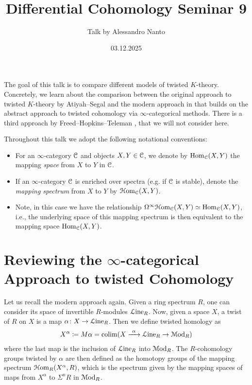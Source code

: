 \documentclass[10pt]{amsart}
\title{Differential Cohomology Seminar 9}
\date{03.12.2025}
\author{Talk by Alessandro Nanto}
\begin{document}
\maketitle

The goal of this talk is to compare different models of twisted $K$-theory. Concretely, we learn about the comparison between the original approach to twisted $K$-theory by Atiyah--Segal \cite{atiyahsegal2004twistedktheory} and the modern approach in \cite{abghr2014infty} that builds on the abstract approach to twisted cohomology via $\infty$-categorical methods. There is a third approach by Freed--Hopkins--Teleman \cite{freedhopkinsteleman2011loopgroupsi}, that we will not consider here.

\begin{remark}
	Throughout this talk we adopt the following notational conventions:
	\begin{itemize}
		\item For an $\infty$-category $\mathcal{C}$ and objects $X,Y \in \mathcal{C}$, we denote by $\mathrm{Hom}_{\mathcal{C}}(X,Y)$ the mapping \emph{space} from $X$ to $Y$ in $\mathcal{C}$. 
		\item If an $\infty$-category $\mathcal{C}$ is enriched over spectra (e.g. if $\mathcal{C}$ is stable), denote the \emph{mapping	spectrum} from $X$ to $Y$ by $\mathcal{H}\mathrm{om}_{\mathcal{C}}(X,Y)$. 
  \item Note, in this case we have the relationship $\Omega^{\infty} \mathcal{H}\mathrm{om}_{\mathcal{C}}(X,Y) \simeq \mathrm{Hom}_{\mathcal{C}}(X,Y)$, i.e., the underlying space of this mapping spectrum is then equivalent to the mapping space $\mathrm{Hom}_{\mathcal{C}}(X,Y)$.
	\end{itemize}
\end{remark}

\section{Reviewing the \texorpdfstring{$\infty$}{oo}-categorical Approach to twisted Cohomology}
Let us recall the modern approach again. Given a ring spectrum	$R$, one can consider its space of invertible $R$-modules $\mathcal{L}\mathrm{ine}_R$. Now, given a space $X$, a twist of $R$ on $X$ is a map $\alpha \colon X \to \mathcal{L}\mathrm{ine}_R$. Then we define twisted homology as
\[X^\alpha \coloneq M \alpha = \operatorname*{colim} (X \xrightarrow{ \ \alpha \ } \mathcal{L}\mathrm{ine}_R \to \mathcal{M}\mathrm{od}_R) \]
where the last map is the inclusion of $\mathcal{L}\mathrm{ine}_R$ into $\mathcal{M}\mathrm{od}_R$. The $R$-cohomology groups twisted by $\alpha$ are then defined as the homotopy groups of the mapping spectrum $\mathcal{H}\mathrm{om}_R(X^\alpha,  R)$, which is the spectrum given by the mapping spaces of maps from $X^\alpha$ to $\Sigma^n R$	in $\mathcal{M}\mathrm{od}_R$.
\end{document}
